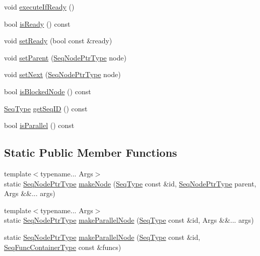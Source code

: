 \begin{DoxyCompactItemize}
void \hyperlink{structvt_1_1seq_1_1_seq_node_a1e13cfd0886c5b377cf6b02d584096e5}{execute\+If\+Ready} ()
\item 
bool \hyperlink{structvt_1_1seq_1_1_seq_node_a94e0c20ef534afed7180b16d8af9a268}{is\+Ready} () const
\item 
void \hyperlink{structvt_1_1seq_1_1_seq_node_af12dafb9242411bc072f3889aa7afaae}{set\+Ready} (bool const \&ready)
\item 
void \hyperlink{structvt_1_1seq_1_1_seq_node_ae475f4a6a842766eb22bdd3204b35719}{set\+Parent} (\hyperlink{namespacevt_1_1seq_ae6a4874b585be0612aaca32ca6d2d191}{Seq\+Node\+Ptr\+Type} node)
\item 
void \hyperlink{structvt_1_1seq_1_1_seq_node_afd77c05a6301d91d1ac3dab9c84d2561}{set\+Next} (\hyperlink{namespacevt_1_1seq_ae6a4874b585be0612aaca32ca6d2d191}{Seq\+Node\+Ptr\+Type} node)
\item 
bool \hyperlink{structvt_1_1seq_1_1_seq_node_a18b16cf28c574103927ee3ba86ed25a4}{is\+Blocked\+Node} () const
\item 
\hyperlink{namespacevt_1_1seq_a3b612da217ac669d39c159f134ab8434}{Seq\+Type} \hyperlink{structvt_1_1seq_1_1_seq_node_a1bd6d41892c8291b6222465c72c33eba}{get\+Seq\+ID} () const
\item 
bool \hyperlink{structvt_1_1seq_1_1_seq_node_ac1b29546daefe9e5983e42a1acf5b961}{is\+Parallel} () const
\end{DoxyCompactItemize}
\subsection*{Static Public Member Functions}
\begin{DoxyCompactItemize}
\item 
{\footnotesize template$<$typename... Args$>$ }\\static \hyperlink{namespacevt_1_1seq_ae6a4874b585be0612aaca32ca6d2d191}{Seq\+Node\+Ptr\+Type} \hyperlink{structvt_1_1seq_1_1_seq_node_a5db1688ed515cf55ae71c58259560bc3}{make\+Node} (\hyperlink{namespacevt_1_1seq_a3b612da217ac669d39c159f134ab8434}{Seq\+Type} const \&id, \hyperlink{namespacevt_1_1seq_ae6a4874b585be0612aaca32ca6d2d191}{Seq\+Node\+Ptr\+Type} parent, Args \&\&... args)
\item 
{\footnotesize template$<$typename... Args$>$ }\\static \hyperlink{namespacevt_1_1seq_ae6a4874b585be0612aaca32ca6d2d191}{Seq\+Node\+Ptr\+Type} \hyperlink{structvt_1_1seq_1_1_seq_node_aa7b64d1e28e2516f7041d0f682ea6d5a}{make\+Parallel\+Node} (\hyperlink{namespacevt_1_1seq_a3b612da217ac669d39c159f134ab8434}{Seq\+Type} const \&id, Args \&\&... args)
\item 
static \hyperlink{namespacevt_1_1seq_ae6a4874b585be0612aaca32ca6d2d191}{Seq\+Node\+Ptr\+Type} \hyperlink{structvt_1_1seq_1_1_seq_node_a6f750e19fb10c44756874ec41c1de31b}{make\+Parallel\+Node} (\hyperlink{namespacevt_1_1seq_a3b612da217ac669d39c159f134ab8434}{Seq\+Type} const \&id, \hyperlink{namespacevt_1_1seq_a3d4575155fb9c0aeeb30b089adfdd04d}{Seq\+Func\+Container\+Type} const \&funcs)
\end{DoxyCompactItemize}
